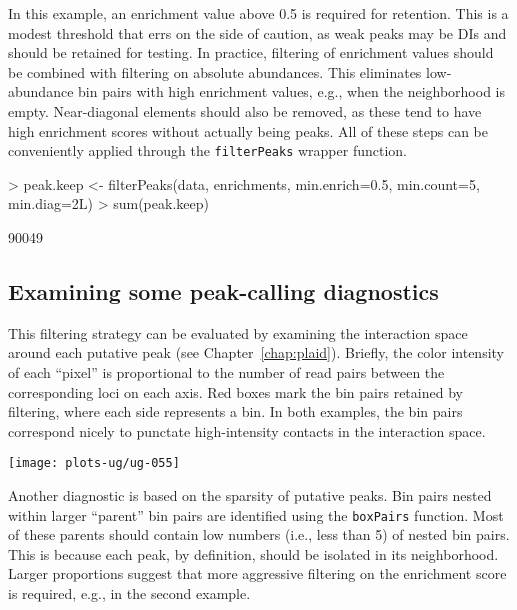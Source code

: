 \documentclass[12pt]{report}
\renewenvironment{Schunk}{\vspace{0pt}}{\vspace{0pt}}
\newcommand{\code}[1]{{\small\texttt{#1}}}
\begin{document}
In this example, an enrichment value above 0.5 is required for retention.
This is a modest threshold that errs on the side of caution, as weak peaks may be DIs and should be retained for testing.
In practice, filtering of enrichment values should be combined with filtering on absolute abundances.
This eliminates low-abundance bin pairs with high enrichment values, e.g., when the neighborhood is empty.
Near-diagonal elements should also be removed, as these tend to have high enrichment scores without actually being peaks.
All of these steps can be conveniently applied through the \code{filterPeaks} wrapper function.

\begin{Schunk}
\begin{Sinput}
> peak.keep <- filterPeaks(data, enrichments, min.enrich=0.5, min.count=5, min.diag=2L)
> sum(peak.keep)
\end{Sinput}
\begin{Soutput}
[1] 90049
\end{Soutput}
\end{Schunk}

\subsection{Examining some peak-calling diagnostics}
This filtering strategy can be evaluated by examining the interaction space around each putative peak (see Chapter~\ref{chap:plaid}).
Briefly, the color intensity of each ``pixel'' is proportional to the number of read pairs between the corresponding loci on each axis.
Red boxes mark the bin pairs retained by filtering, where each side represents a bin.
In both examples, the bin pairs correspond nicely to punctate high-intensity contacts in the interaction space.

\begin{center}
\texttt{[image: plots-ug/ug-055]}
\end{center}

Another diagnostic is based on the sparsity of putative peaks.
Bin pairs nested within larger ``parent'' bin pairs are identified using the \code{boxPairs} function.
Most of these parents should contain low numbers (i.e., less than 5) of nested bin pairs.
This is because each peak, by definition, should be isolated in its neighborhood.
Larger proportions suggest that more aggressive filtering on the enrichment score is required, e.g., in the second example. 
\end{document}
